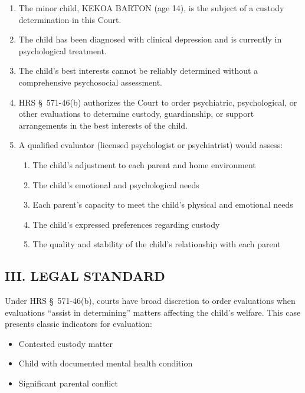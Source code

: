 \documentclass[11pt,letter]{article}
\begin{document}
\begin{enumerate}
\item The minor child, KEKOA BARTON (age 14), is the subject of a custody determination in this Court.

\item The child has been diagnosed with clinical depression and is currently in psychological treatment.

\item The child's best interests cannot be reliably determined without a comprehensive psychosocial assessment.

\item HRS \S~571-46(b) authorizes the Court to order psychiatric, psychological, or other evaluations to determine custody, guardianship, or support arrangements in the best interests of the child.

\item A qualified evaluator (licensed psychologist or psychiatrist) would assess:
  \begin{enumerate}
  \item The child's adjustment to each parent and home environment
  \item The child's emotional and psychological needs
  \item Each parent's capacity to meet the child's physical and emotional needs
  \item The child's expressed preferences regarding custody
  \item The quality and stability of the child's relationship with each parent
  \end{enumerate}

\end{enumerate}

\subsection*{III. LEGAL STANDARD}

Under HRS \S~571-46(b), courts have broad discretion to order evaluations when evaluations ``assist in determining'' matters affecting the child's welfare. This case presents classic indicators for evaluation:
\begin{itemize}
\item Contested custody matter
\item Child with documented mental health condition
\item Significant parental conflict
\end{itemize}
\end{document}
